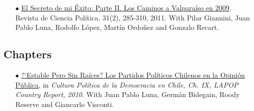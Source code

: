 \begin{itemize}
  \item[$\bullet$] \href{http://www.revistacienciapolitica.cl/rcp/wp-content/uploads/2013/09/07_vol_31_2.pdf}{El Secreto de mi \'Exito: Parte II. Los Caminos a Valpara\'iso en 2009}. Revista de Ciencia Pol\'itica. 31(2), 285-310, 2011. With Pilar Giannini, Juan Pablo Luna, Rodolfo L\'opez, Mart\'in Ordo\~nez and Gonzalo Recart.


\end{itemize}




\subsection*{Chapters}

\begin{itemize}
\item[$\bullet$] \href{http://www.vanderbilt.edu/lapop/chile/Chile-2010-cultura-politica.pdf}{?`Estable Pero Sin Ra\'ices? Los Partidos Pol\'iticos Chilenos en la Opini\'on P\'ublica}, in \emph{Cultura Pol\'itica de la Democracia en Chile, Ch. IX, LAPOP Country Report, 2010}. With Juan Pablo Luna, Germ\'an Bidegain, Roody Reserve and Giancarlo Visconti.
\end{itemize}
